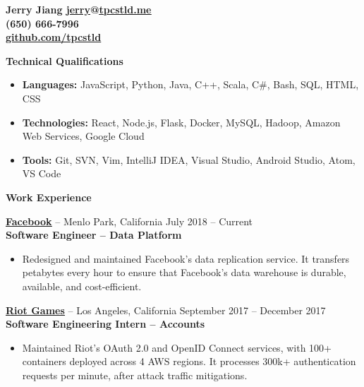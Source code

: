 \documentclass{letter}
\begin{document}
  \thispagestyle{empty}


{\bfseries
  {\Large Jerry Jiang} \hfill \href{mailto:jerry@tpcstld.me}{\uline{jerry}}@\href{http://tpcstld.me}{\uline{tpcstld.me}} \\
  \null \hfill (650) 666-7996 \\
\null \hfill \href{https://github.com/tpcstld}{\uline{github.com/tpcstld}}}

{\bfseries \Large Technical Qualifications}

\vspace{-10mm}
\null\hrulefill

\vspace{-3mm}
\begin{itemize}
    \item {\bfseries Languages:}
        JavaScript, Python, Java, C++, Scala, C\#, Bash, SQL, HTML, CSS
    \item {\bfseries Technologies:}
        React, Node.js, Flask, Docker, MySQL, Hadoop, Amazon Web Services, Google Cloud
    \item {\bfseries Tools:}
        Git, SVN, Vim, IntelliJ IDEA, Visual Studio, Android Studio, Atom, VS
        Code
\end{itemize}

{\bfseries \Large Work Experience}

\vspace{-10mm}
\null\hrulefill

\vspace{-1.5mm}
{\bfseries \href{http://facebook.com}{\uline{Facebook}}} -- Menlo Park,
California \hfill July 2018 -- Current \\
{\bfseries Software Engineer -- Data Platform}
\vspace{-3mm}
\begin{itemize}
    \item Redesigned and maintained Facebook's data replication service. It
      transfers petabytes every hour to ensure that Facebook's data warehouse
      is durable, available, and cost-efficient.
\end{itemize}

\vspace{-1.5mm}
{\bfseries \href{http://riotgames.com}{\uline{Riot Games}}} -- Los Angeles,
California \hfill September 2017 -- December 2017\\
{\bfseries Software Engineering Intern -- Accounts}
\vspace{-3mm}
\begin{itemize}
    \item Maintained Riot's OAuth 2.0 and OpenID Connect services, with 100+
      containers deployed across 4 AWS regions. It processes 300k+
      authentication requests per minute, after attack traffic mitigations.
\end{itemize}
\end{document}
